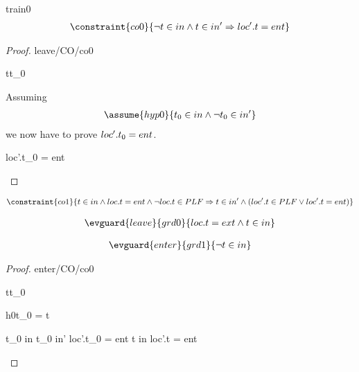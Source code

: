 \documentclass[12pt]{amsart}
\begin{document}
\begin{machine}{train0}
%
\begin{align*}
\constraint{co0}
{	\neg t \in in \land t \in in' \implies  loc'.t = ent } %
\end{align*}
%
\begin{proof}{leave/CO/co0}
	\begin{free:var}{t}{t_0}
	
	\noindent Assuming
	\begin{align}
	\assume{hyp0}{ t_0 \in in \land \neg  t_0 \in in' }
	\end{align}
	we now have to prove $ loc'.t_0 = ent $.
	
	\begin{calculation}
		loc'.t_0 = ent
	\hint{\follows}{ }
		\false
	\hint{=}{ \eqref{hyp0} }
		\true
	\end{calculation}
	\end{free:var}
\end{proof}
%
\begin{align*}
\constraint{co1}
{	 t \in in \land loc.t = ent  \land \neg loc.t \in PLF 
\implies t \in in' \land (loc'.t \in PLF \lor loc'.t = ent)	}
\end{align*}


%

\begin{align*}
\evguard{leave}{grd0}
{	loc.t = ext \land t \in in	}
\end{align*}

\begin{align*}
\evguard{enter}{grd1}
{	\neg t \in in	}
\end{align*}

\begin{proof}{enter/CO/co0}
	\begin{free:var}{t}{t_0}

	\begin{by:cases}

	\begin{case}{h0}{t_0 = t}
	\begin{calculation}
		\neg t_0 \in in \land t_0 \in in' \implies  loc'.t_0 = ent 
	\hint{=}{ \eqref{h0} and \ref{a1}  }
		\neg t \in in \implies  loc'.t = ent 
	\hint{=}{ \ref{a2} }
		\true
	\end{calculation}


\end{case}
\end{by:cases}
\end{free:var}
\end{proof}
\end{machine}
\end{document}
